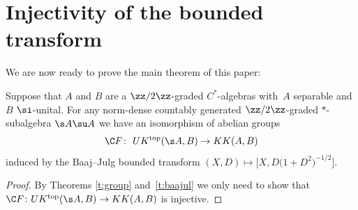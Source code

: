 \section{Injectivity of the bounded transform}\label{s:injbou}
We are now ready to prove the main theorem of this paper:

\begin{Theorem}\label{t:isobaajul}
Suppose that $A$ and $B$ are a $\zz/2\zz$-graded $C^*$-algebras with~$A$ separable and~$B$ $\si$-unital. For any norm-dense countably generated $\zz/2\zz$-graded $*$-subalgebra $\s A \su A$ we have an isomorphism of abelian groups
\[
\C F\colon \ UK^{{\rm top}}(\s A, B) \to KK(A,B)
\]
induced by the Baaj--Julg bounded transform $(X,D) \mapsto \big[X, D\big(1 + D^2\big)^{-1/2}\big]$.
\end{Theorem}
\begin{proof}
By Theorems \ref{t:group} and~\ref{t:baajul} we only need to show that $\C F\colon UK^{{\rm top}}(\s A,B) \to KK(A,B)$ is injective.


\end{proof}
